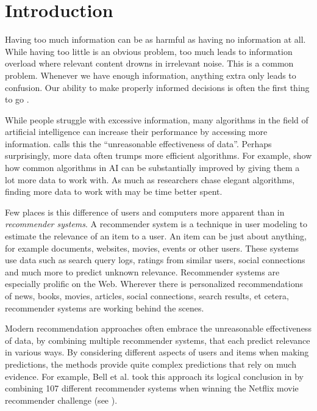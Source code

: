 \section{Introduction}
\label{sec:intro}

Having too much information can be as harmful as having no information at all.
While having too little is an obvious problem,
too much leads to information overload where relevant content drowns in irrelevant noise.
This is a common problem. Whenever we have enough information,
anything extra only leads to confusion.
Our ability to make properly informed decisions is often the first thing to go
\cite[p.1]{Davenport2001}.

While people struggle with excessive information,
many algorithms in the field of artificial intelligence
can increase their performance by accessing more information.
\cite{Halevy2009} calls this the ``unreasonable effectiveness of data''.
Perhaps surprisingly, more data often trumps more efficient algorithms.
For example, \cite[p.3]{Banko2001} show how common algorithms in AI 
can be substantially improved by giving them a lot more data to work with.
As much as researchers chase elegant algorithms, finding more data to work with may be time better spent.

Few places is this difference of users and computers more apparent than in \emph{recommender systems}.
A recommender system is a technique in user modeling to estimate the relevance of an item to a user.
An item can be just about anything, for example documents, websites, movies, events or other users.
These systems use data such as search query logs, 
ratings from similar users, social connections and much more
to predict unknown relevance.
Recommender systems are especially prolific on the Web. 
Wherever there is personalized recommendations of news, books, movies,
articles, social connections, search results, et cetera, recommender systems are working behind the scenes.

Modern recommendation approaches often embrace the 
unreasonable effectiveness of data,
by combining multiple recommender systems, that each predict relevance in various ways.
By considering different aspects of users and items when making predictions,
the methods provide quite complex predictions that rely on much evidence.
For example, Bell et al. took this approach its logical conclusion in \cite{Bell2007} by 
combining 107 different recommender systems when winning the 
Netflix movie recommender challenge
(see \cite{Linden2009}).

